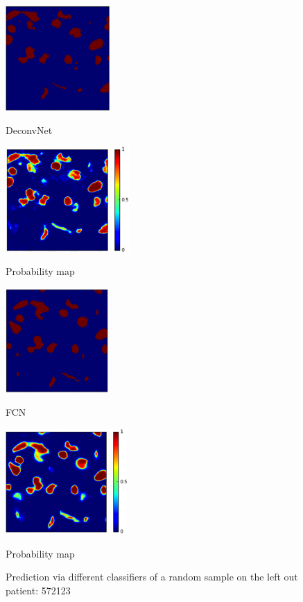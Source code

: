 \documentclass{article}
\begin{document}
\begin{figure}[htb]
%
%
\begin{minipage}[b]{.48\linewidth}
  \centering
  \centerline{\includegraphics[height=4.0cm]{DeconvNetB}}
  \centerline{DeconvNet}\medskip
\end{minipage}
\hfill
\begin{minipage}[b]{0.48\linewidth}
  \centering
  \centerline{\includegraphics[height=4.0cm]{DeconvNetP}}
  \centerline{Probability map}\medskip
\end{minipage}
%
%
\begin{minipage}[b]{.48\linewidth}
  \centering
  \centerline{\includegraphics[height=4.0cm]{FCNB}}
  \centerline{FCN}\medskip
\end{minipage}
\hfill
\begin{minipage}[b]{0.48\linewidth}
  \centering
  \centerline{\includegraphics[height=4.0cm]{FCNP}}
  \centerline{Probability map}\medskip
\end{minipage}
%
\caption{Prediction via different classifiers of a random sample on the left out patient: 572123}
\label{fig:prediction}
%
\end{figure}
\end{document}
